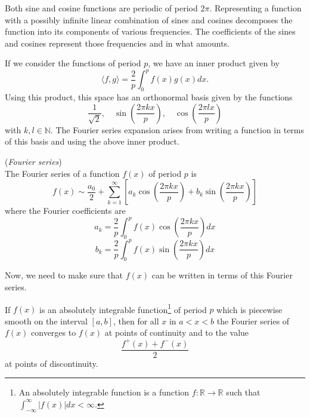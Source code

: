 \documentclass[00main.tex]{subfiles}
\begin{document}
Both sine and cosine functions are periodic of period $2\pi$. Representing a function with a possibly infinite linear combination of sines and cosines decomposes the function into its components of various frequencies. The coefficients of the sines and cosines represent those frequencies and in what amounts.



If we consider the functions of period $p$, we %
have an inner product given by \[ \langle f, g \rangle = \frac{2}{p} \int_0^{p} f(x) g(x) dx. \] Using this product, this space has an orthonormal basis given by the functions \[  \frac{1}{\sqrt{2}}, \quad \sin \left( \frac{2\pi kx}{p} \right), \quad \cos \left( \frac{2\pi lx}{p} \right) \] with $k,l \in \mathbb{N}$. The Fourier series expansion arises from writing a function in terms of this basis and using the above inner product.

\begin{defi}(\emph{Fourier series})\\
The Fourier series of a function $f(x)$ of period $p$ is \begin{equation}
f(x) \sim \frac{a_0}{2} + \sum_{k=1}^\infty \left[ a_k \cos \left( \frac{2\pi kx}{p} \right) + b_k \sin \left( \frac{2\pi kx}{p} \right) \right] \label{fourier}
\end{equation} where the Fourier coefficients are \[ a_k = \frac{2}{p} \int_0^p f(x) \cos \left( \frac{2\pi kx}{p} \right) dx \] \[ b_k = \frac{2}{p} \int_0^p f(x) \sin \left( \frac{2\pi kx}{p} \right) dx \] 
\end{defi}

Now, we need to make sure that $f(x)$ can be written in terms of this Fourier series.

\begin{theorem}
If $f(x)$ is an absolutely integrable function\footnote{An absolutely integrable function is a function $f:\mathbb{R} \to \mathbb{R}$ such that $\int_{-\infty}^\infty |f(x)| dx < \infty$.} of period $p$ which is piecewise smooth on the interval $[a,b]$, then for all $x$ in $a<x<b$ the Fourier series of $f(x)$ converges to $f(x)$ at points of continuity and to the value \[ \frac{f^+(x)+f^-(x)}{2} \] at points of discontinuity. \label{fourier_theo}
\end{theorem}
\end{document}

